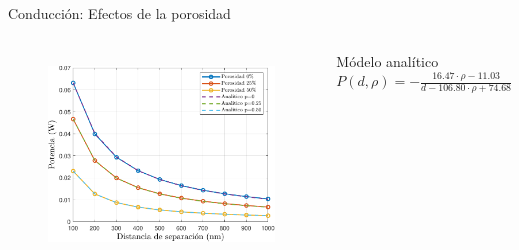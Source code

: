 \documentclass[spanish,a4paper]{beamer}%
\newcommand{\resCondPath}{\graphicspath{{./figuras/Resultados/conduccion/}}}
\begin{document}
		\begin{frame}{Conducción: Efectos de la porosidad}
			\resCondPath
			\begin{columns}
			
			\begin{figure}[t]
				\centering
					\includegraphics[width=1.00\columnwidth]{Ppor_SiSiO2Si}
				\label{fig:Ppor_SiSiO2Si}
			\end{figure}
			
			\begin{block}{Módelo analítico}
			 \centering 
				\itshape $P(d,\rho)=- \frac{  16.47\cdot \rho-11.03 }{d-106.80\cdot \rho +74.68}$
			\end{block}
			\end{columns}
		\end{frame}
\end{document}
